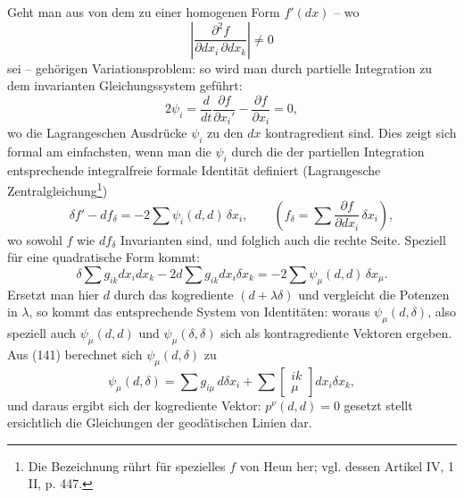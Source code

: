 Geht man aus von dem zu einer homogenen Form $f'(dx)$ -- wo
\[
\left|\frac{\partial^2 f}{\partial dx_i\,\partial dx_k}\right|\ne0
\]
sei -- gehörigen Variationsproblem:
so wird man durch partielle Integration zu dem invarianten Gleichungssystem geführt:
\[
 2\psi_i=\frac{d}{dt}\frac{\partial f}{\partial x_i'}-\frac{\partial f}{\partial x_i}=0,
\]
wo die Lagrangeschen Ausdrücke $\psi_i$ zu den $dx$ kontragredient sind. Dies zeigt sich formal am einfachsten, wenn man die $\psi_i$ durch die der partiellen Integration entsprechende integralfreie formale Identität definiert (Lagrangesche Zentralgleichung\footnote{Die Bezeichnung rührt für spezielles $f$ von Heun her; vgl. dessen Artikel IV, 1 II, p. 447.})
\[
 \delta f'-df_\delta=-2\sum\psi_i(d,d)\,\delta x_i,
 \qquad
 \left(f_\delta=\sum\frac{\partial f}{\partial dx_i}\,\delta x_i\right),
\]
wo sowohl $f$ wie $df_\delta$ Invarianten sind, und folglich auch die rechte Seite. Speziell für eine quadratische Form kommt:
\[
 \delta\sum g_{ik}dx_i dx_k-2d\sum g_{ik}dx_i\delta x_k
 =-2\sum\psi_\mu(d,d)\,\delta x_\mu.
\]
Ersetzt man hier $d$ durch das kogrediente $(d+\lambda\delta)$ und vergleicht die Potenzen in $\lambda$, so kommt das entsprechende System von Identitäten:
woraus $\psi_\mu(d,\delta)$, also speziell auch $\psi_\mu(d,d)$ und $\psi_\mu(\delta,\delta)$ sich als kontragrediente Vektoren ergeben. Aus (141) berechnet sich $\psi_\mu(d,\delta)$ zu
\[
 \psi_\mu(d,\delta)=\sum g_{i\mu}\,d\delta x_i+
 \sum\left[\begin{smallmatrix}ik\\ \mu\end{smallmatrix}\right]dx_i\delta x_k,
\]
und daraus ergibt sich der kogrediente Vektor:
$p^\nu(d,d)=0$ gesetzt stellt ersichtlich die Gleichungen der geodätischen Linien dar.

